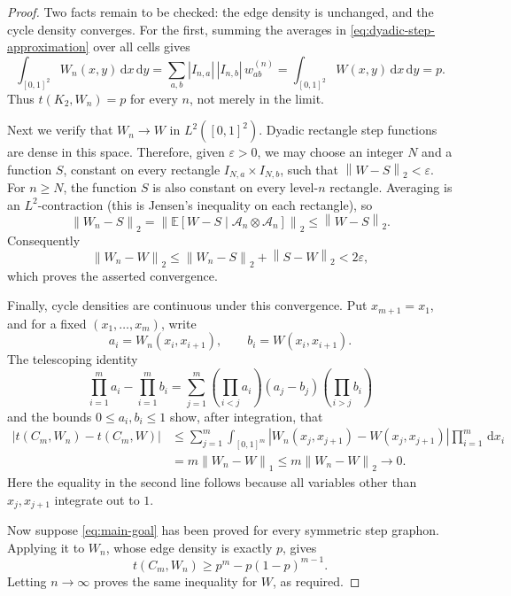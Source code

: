 \documentclass[11pt]{article}
\newcommand{\norm}[1]{\left\lVert #1\right\rVert}
\newcommand{\dd}{\,\mathrm d}
\newcommand{\E}{\mathbb E}
\begin{document}
\begin{proof}
Two facts remain to be checked: the edge density is unchanged, and the cycle
density converges.  For the first, summing the averages in
\eqref{eq:dyadic-step-approximation} over all cells gives
\[
 \int_{[0,1]^2}W_n(x,y)\dd x\dd y
 =\sum_{a,b}|I_{n,a}|\,|I_{n,b}|\,w^{(n)}_{ab}
 =\int_{[0,1]^2}W(x,y)\dd x\dd y=p.
\]
Thus \(t(K_2,W_n)=p\) for every \(n\), not merely in the limit.

Next we verify that \(W_n\to W\) in \(L^2([0,1]^2)\).  Dyadic rectangle
step functions are dense in this space.  Therefore, given \(\varepsilon>0\),
we may choose an integer \(N\) and a function \(S\), constant on every
rectangle \(I_{N,a}\times I_{N,b}\), such that
\(\norm{W-S}_2<\varepsilon\).  For \(n\ge N\), the function \(S\) is also
constant on every level-\(n\) rectangle.  Averaging is an \(L^2\)-contraction
(this is Jensen's inequality on each rectangle), so
\[
 \norm{W_n-S}_2
 =\norm{\E[W-S\mid\mathcal A_n\otimes\mathcal A_n]}_2
 \le \norm{W-S}_2.
\]
Consequently
\[
       \norm{W_n-W}_2
       \le \norm{W_n-S}_2+\norm{S-W}_2
       <2\varepsilon,
\]
which proves the asserted convergence.

Finally, cycle densities are continuous under this convergence.  Put \(x_{m+1}=x_1\), and for a fixed
\((x_1,\ldots,x_m)\), write
\[
       a_i=W_n(x_i,x_{i+1}),\qquad b_i=W(x_i,x_{i+1}).
\]
The telescoping identity
\[
 \prod_{i=1}^m a_i-\prod_{i=1}^m b_i
 =\sum_{j=1}^m
   \left(\prod_{i<j}a_i\right)(a_j-b_j)
   \left(\prod_{i>j}b_i\right)
\]
and the bounds \(0\le a_i,b_i\le1\) show, after integration, that
\begin{align*}
 \bigl|t(C_m,W_n)-t(C_m,W)\bigr|
 &\le \sum_{j=1}^m
       \int_{[0,1]^m}
       |W_n(x_j,x_{j+1})-W(x_j,x_{j+1})|
       \prod_{i=1}^m\dd x_i \\
 &=m\norm{W_n-W}_1
 \le m\norm{W_n-W}_2
 \longrightarrow0.
\end{align*}
Here the equality in the second line follows because all variables other
than \(x_j,x_{j+1}\) integrate out to \(1\).

Now suppose \eqref{eq:main-goal} has been proved for every symmetric step
graphon.  Applying it to \(W_n\), whose edge density is exactly \(p\), gives
\[
       t(C_m,W_n)\ge p^m-p(1-p)^{m-1}.
\]
Letting \(n\to\infty\) proves the same inequality for \(W\), as required.
\end{proof}
\end{document}
